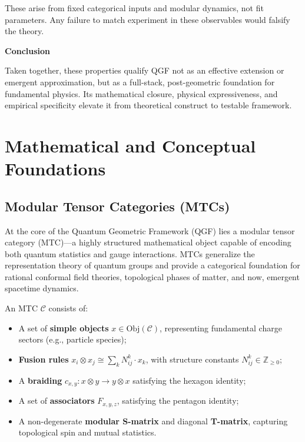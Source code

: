 \documentclass[11pt]{article}
\begin{document}
These arise from fixed categorical inputs and modular dynamics, not fit parameters. Any failure to match experiment in these observables would falsify the theory.

\vspace{0.5em}
\noindent\textbf{Conclusion}

Taken together, these properties qualify QGF not as an effective extension or emergent approximation, but as a full-stack, post-geometric foundation for fundamental physics. Its mathematical closure, physical expressiveness, and empirical specificity elevate it from theoretical construct to testable framework.

\section{Mathematical and Conceptual Foundations}

\subsection{Modular Tensor Categories (MTCs)}

At the core of the Quantum Geometric Framework (QGF) lies a modular tensor category (MTC)—a highly structured mathematical object capable of encoding both quantum statistics and gauge interactions. MTCs generalize the representation theory of quantum groups and provide a categorical foundation for rational conformal field theories, topological phases of matter, and now, emergent spacetime dynamics.

An MTC \( \mathcal{C} \) consists of:
\begin{itemize}
  \item A set of \textbf{simple objects} \( x \in \text{Obj}(\mathcal{C}) \), representing fundamental charge sectors (e.g., particle species);
  \item \textbf{Fusion rules} \( x_i \otimes x_j \cong \sum_k N_{ij}^k \cdot x_k \), with structure constants \( N_{ij}^k \in \mathbb{Z}_{\geq 0} \);
  \item A \textbf{braiding} \( c_{x,y}: x \otimes y \to y \otimes x \) satisfying the hexagon identity;
  \item A set of \textbf{associators} \( F_{x,y,z} \), satisfying the pentagon identity;
  \item A non-degenerate \textbf{modular S-matrix} and diagonal \textbf{T-matrix}, capturing topological spin and mutual statistics.
\end{itemize}
\end{document}
